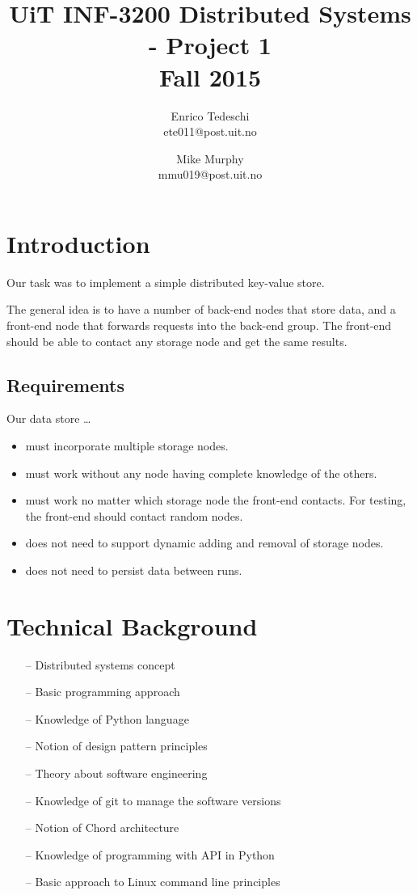 \documentclass[11pt,conference]{IEEEtran}
\title{UiT INF-3200 Distributed Systems - Project 1\\Fall 2015}
\author{Enrico Tedeschi\\ete011@post.uit.no
    \and Mike Murphy\\mmu019@post.uit.no}
\begin{document}
\maketitle


\section{Introduction}

Our task was to implement a simple distributed key-value store.

The general idea is to have a number of back-end nodes that store data, and a
front-end node that forwards requests into the back-end group. The front-end
should be able to contact any storage node and get the same results.


\subsection{Requirements}

Our data store \ldots

\begin{itemize}
\item must incorporate multiple storage nodes.
\item must work without any node having complete knowledge of the others.
\item must work no matter which storage node the front-end contacts. For
    testing, the front-end should contact random nodes.
\item does not need to support dynamic adding and removal of storage nodes.
\item does not need to persist data between runs.
\end{itemize}


\section{Technical Background}


\begin{itemize} 
\item[--] Distributed systems concept
\item[--] Basic programming approach
\item[--] Knowledge of Python language
\item[--] Notion of design pattern principles
\item[--] Theory about software engineering
\item[--] Knowledge of git to manage the software versions
\item[--] Notion of Chord architecture
\item[--] Knowledge of programming with API in Python
\item[--] Basic approach to Linux command line principles
\end{itemize}
\end{document}
